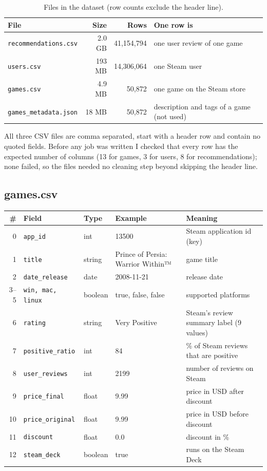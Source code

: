 \documentclass[11pt,a4paper]{article}
\newcommand{\code}[1]{\texttt{#1}}
\begin{document}
\begin{table}[H]\centering
\begin{tabular}{lrrl}
\toprule
File & Size & Rows & One row is \\
\midrule
\code{recommendations.csv} & 2.0 GB & 41,154,794 & one user review of one game \\
\code{users.csv}           & 193 MB & 14,306,064 & one Steam user \\
\code{games.csv}           & 4.9 MB & 50,872     & one game on the Steam store \\
\code{games\_metadata.json} & 18 MB & 50,872    & description and tags of a game (not used) \\
\bottomrule
\end{tabular}
\caption{Files in the dataset (row counts exclude the header line).}
\end{table}

All three CSV files are comma separated, start with a header row and contain no quoted fields.
Before any job was written I checked that every row has the expected number of columns
(13 for games, 3 for users, 8 for recommendations); none failed, so the files needed no cleaning
step beyond skipping the header line.

\subsection*{games.csv}
\begin{table}[H]\centering\small
\begin{tabularx}{\linewidth}{rlll X}
\toprule
\# & Field & Type & Example & Meaning \\
\midrule
0  & \code{app\_id}         & int     & 13500 & Steam application id (key) \\
1  & \code{title}           & string  & Prince of Persia: Warrior Within™ & game title \\
2  & \code{date\_release}   & date    & 2008-11-21 & release date \\
3–5 & \code{win, mac, linux} & boolean & true, false, false & supported platforms \\
6  & \code{rating}          & string  & Very Positive & Steam's review summary label (9 values) \\
7  & \code{positive\_ratio} & int     & 84 & \% of Steam reviews that are positive \\
8  & \code{user\_reviews}   & int     & 2199 & number of reviews on Steam \\
9  & \code{price\_final}    & float   & 9.99 & price in USD after discount \\
10 & \code{price\_original} & float   & 9.99 & price in USD before discount \\
11 & \code{discount}        & float   & 0.0 & discount in \% \\
12 & \code{steam\_deck}     & boolean & true & runs on the Steam Deck \\
\bottomrule
\end{tabularx}
\end{table}
\end{document}
